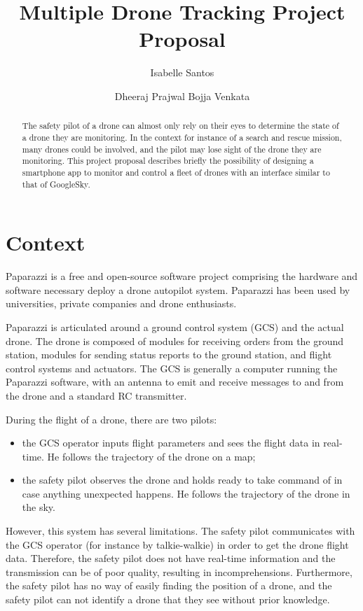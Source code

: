 \documentclass[10pt,letterpaper]{article}
\author{Isabelle Santos \and Dheeraj Prajwal Bojja Venkata}
\title{Multiple Drone Tracking Project Proposal}
\begin{document}
\maketitle
\begin{abstract}
The safety pilot of a drone can almost only rely on their eyes to determine the state of a drone they are monitoring. In the context for instance of a search and rescue mission, many drones could be involved, and the pilot may lose sight of the drone they are monitoring. This project proposal describes briefly the possibility of designing a smartphone app to monitor and control a fleet of drones with an interface similar to that of GoogleSky.
\end{abstract}

\section{Context}
Paparazzi is a free and open-source software project \cite{Paparazzi} comprising the hardware and software necessary deploy a drone autopilot system. Paparazzi has been used by universities, private companies and drone enthusiasts. 

Paparazzi is articulated around a ground control system (GCS) and the actual drone. The drone is composed of modules for receiving orders from the ground station, modules for sending status reports to the ground station, and flight control systems and actuators. The GCS is generally a computer running the Paparazzi software, with an antenna to emit and receive messages to and from the drone and a standard RC transmitter. 

During the flight of a drone, there are two pilots:
\begin{itemize}
\item the GCS operator inputs flight parameters and sees the flight data in real-time. He follows the trajectory of the drone on a map;
\item the safety pilot observes the drone and holds ready to take command of in case anything unexpected happens. He follows the trajectory of the drone in the sky. 
\end{itemize}

However, this system has several limitations. The safety pilot communicates with the GCS operator (for instance by talkie-walkie) in order to get the drone flight data. Therefore, the safety pilot does not have real-time information and the transmission can be of poor quality, resulting in incomprehensions. Furthermore, the safety pilot has no way of easily finding the position of a drone, and the safety pilot can not identify a drone that they see without prior knowledge.
\end{document}
